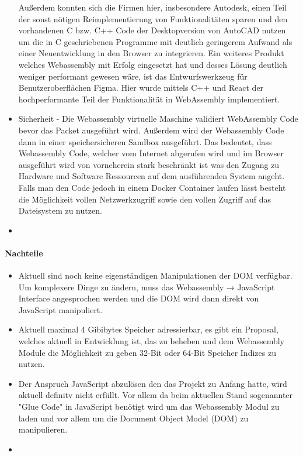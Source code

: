 \begin{itemize}
            Außerdem konnten sich die Firmen hier, insbesondere Autodesk, einen Teil der sonst nötigen Reimplementierung von Funktionalitäten sparen und den vorhandenen C bzw. C++ Code der Desktopversion
            von AutoCAD nutzen um die in C geschriebenen Programme mit deutlich geringerem Aufwand als einer Neuentwicklung in den Browser zu integrieren. Ein weiteres Produkt welches Webassembly
        	mit Erfolg eingesetzt hat und desses Lösung deutlich weniger performant gewesen wäre, ist das Entwurfswerkzeug für Benutzeroberflächen Figma. Hier wurde mittels C++ und React der hochperformante Teil der Funktionalität
            in WebAssembly implementiert.
    \item   Sicherheit - Die Webassembly virtuelle Maschine validiert WebAssembly Code bevor das Packet ausgeführt wird. Außerdem wird der Webassembly Code dann in einer speichersicheren Sandbox ausgeführt.
            Das bedeutet, dass Webassembly Code, welcher vom Internet abgerufen wird und im Browser ausgeführt wird von vorneherein stark beschränkt ist was den Zugang zu Hardware und Software
            Ressourcen auf dem ausführenden System angeht. Falls man den Code jedoch in einem Docker Container laufen lässt besteht die Möglichkeit vollen Netzwerkzugriff sowie den vollen Zugriff auf das Dateisystem zu nutzen.
    \item   
\end{itemize}
\paragraph*{Nachteile}
\begin{itemize}
    \item   Aktuell sind noch keine eigenständigen Manipulationen der DOM verfügbar. Um komplexere Dinge zu ändern, muss das Webassembly → JavaScript Interface angesprochen werden
            und die DOM wird dann direkt von JavaScript manipuliert.
    \item   Aktuell maximal 4 Gibibytes Speicher adressierbar, es gibt ein Proposal, welches aktuell in Entwicklung ist, das zu beheben und dem
            Webassembly Module die Möglichkeit zu geben 32-Bit oder 64-Bit Speicher Indizes zu nutzen.
    \item   Der Anspruch JavaScript abzulösen den das Projekt zu Anfang hatte, wird aktuell definitv nicht erfüllt. Vor allem da beim aktuellen Stand sogenannter "Glue Code" in JavaScript benötigt 
            wird um das Webassembly Modul zu laden und vor allem um die Document Object Model (DOM) zu manipulieren.
    \item 
\end{itemize}

